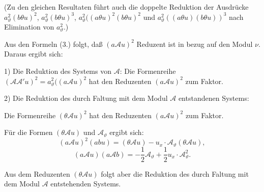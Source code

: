 \documentclass[11pt]{article}
\newcommand{\A}{\mathcal A}
\begin{document}
(Zu den gleichen Resultaten führt auch die doppelte Reduktion der Ausdrücke $a_\vartheta^2(b\theta u)^2$, $a_\vartheta^2(b\theta u)^3$, $a_\vartheta^2((a\theta u)^2(b\theta u)^2$ und $a_\vartheta^2((a\theta u)(b\theta u))^3$ nach Elimination von $a_\vartheta^2$.)

Aus den Formeln (3.) folgt, daß $(a\A u)^2$ Reduzent ist in bezug auf den Modul $\nu$. Daraus ergibt sich:

1) Die Reduktion des Systems von $\A$: Die Formenreihe $(\A\A' u)^2=a_\vartheta^2((a\A u)^2$ hat den Reduzenten $(a\A u)^2$ zum Faktor.

2) Die Reduktion des durch Faltung mit dem Modul $\A$ entstandenen Systems:

Die Formenreihe $(\theta\A u)^2$ hat den Reduzenten $(a\A u)^2$ zum Faktor.

Für die Formen $(\theta\A u)$ und $\A_\vartheta$ ergibt sich:
\[
(a\A u)^2(abu)=(\theta\A u)-u_x\cdot\A_\vartheta(\theta\A u),
\]
\[
(a\A u)(a\A b)=-\frac12\A_\vartheta+\frac12u_x\cdot\A_\vartheta^2.
\]

Aus dem Reduzenten $(\theta\A u)$ folgt aber die Reduktion des durch Faltung mit dem Modul $\A$ entstehenden Systems.
\end{document}
